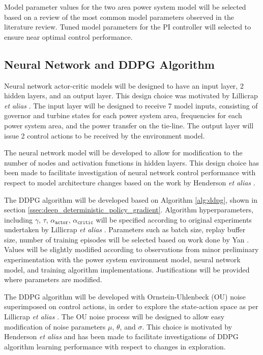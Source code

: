 Model parameter values for the two area power system model will be selected based on a review of the most common model parameters observed in the literature review. Tuned model parameters for the PI controller will selected to ensure near optimal control performance.

\subsection{Neural Network and DDPG Algorithm}\label{ssec:neural_network_model}
Neural network actor-critic models will be designed to have an input layer, 2 hidden layers, and an output layer. This design choice was motivated by Lillicrap \textit{et alias} \cite{Lillicrap2015}. The input layer will be designed to receive 7 model inputs, consisting of governor and turbine states for each power system area, frequencies for each power system area, and the power transfer on the tie-line. The output layer will issue 2 control actions to be received by the environment model.

The neural network model will be developed to allow for modification to the number of nodes and activation functions in hidden layers. This design choice has been made to facilitate investigation of neural network control performance with respect to model architecture changes based on the work by Henderson \textit{et alias} \cite{Henderson2017}.

The DDPG algorithm will be developed based on Algorithm \ref{alg:ddpg}, shown in section \ref{ssec:deep_deterministic_policy_gradient}. Algorithm hyperparameters, including $\gamma$, $\tau$, $\alpha_{\texttt{actor}}$, $\alpha_{\texttt{critic}}$ will be specified according to original experiments undertaken by Lillicrap \textit{et alias} \cite{Lillicrap2015}. Parameters such as batch size, replay buffer size, number of training episodes will be selected based on work done by Yan \cite{Yan2019}. Values will be slightly modified according to observations from minor preliminary experimentation with the power system environment model, neural network model, and training algorithm implementations. Justifications will be provided where parameters are modified.

The DDPG algorithm will be developed with Ornstein-Uhlenbeck (OU) noise superimposed on control actions, in order to explore the state-action space as per Lillicrap \textit{et alias} \cite{Lillicrap2015}. The OU noise process will be designed to allow easy modification of noise parameters $\mu$, $\theta$, and $\sigma$. This choice is motivated by Henderson \textit{et alias} \cite{Henderson2017} and has been made to facilitate investigations of DDPG algorithm learning performance with respect to changes in exploration.


